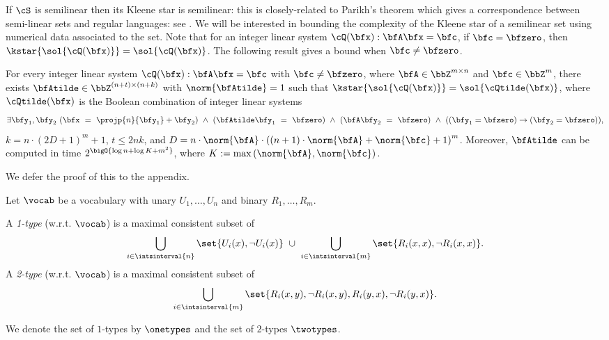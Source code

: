 If $\cS$ is semilinear then its Kleene star is semilinear: this is closely-related to Parikh's theorem which gives a correspondence between semi-linear sets and regular languages: see \cite{parikh,kleenestar}.
We will be interested in bounding the complexity of the Kleene star of a semilinear set using numerical data associated to the set.
Note that for an integer linear system $\cQ(\bfx): \bfA \bfx = \bfc$,
if $\bfc = \bfzero$, then $\kstar{\sol{\cQ(\bfx)}} = \sol{\cQ(\bfx)}$.
The following result gives a bound when $\bfc \neq \bfzero$.

\begin{lemma}\label{lem:key}
    For every integer linear system $\cQ(\bfx): \bfA \bfx = \bfc$ with $\bfc \neq \bfzero$,
    where $\bfA \in \bbZ^{m \times n}$ and $\bfc \in \bbZ^{m}$,
    there exists $\bfAtilde \in \bbZ^{(n+t) \times (n+k)}$ with $\norm{\bfAtilde} = 1$
    such that
    $\kstar{\sol{\cQ(\bfx)}} = \sol{\cQtilde(\bfx)}$,
    where $\cQtilde(\bfx)$ is the  Boolean combination of integer linear systems
    \begin{equation*}    
        \exists \bfy_1, \bfy_2\ 
        (\bfx\ =\ \projp{n}{\bfy_1} + \bfy_2)\ \land\ 
        (\bfAtilde\bfy_1\ =\ \bfzero)\ \land\ 
        (\bfA\bfy_2\ =\ \bfzero)\ \land\ 
        ((\bfy_1=\bfzero) \to (\bfy_2=\bfzero)),
    \end{equation*}
    $k = n\cdot(2D+1)^{m} + 1$,
    $t \le 2nk$, and
    $D = n \cdot \norm{\bfA} \cdot \left((n+1)\cdot \norm{\bfA} + \norm{\bfc} + 1\right)^{m}$.
    Moreover, $\bfAtilde$ can be computed in time $2^\bigO{\log n + \log K + m^2}$,
    where $K := \max\left(\norm{\bfA}, \norm{\bfc}\right)$.
\end{lemma}

We defer the proof of this to the appendix.


Let $\vocab$ be a vocabulary with unary  $U_1, \ldots, U_n$ and binary  $R_1, \ldots, R_m$.
\begin{definition}
    A \emph{1-type} (w.r.t. $\vocab$) is a maximal consistent subset of
    \begin{equation*}
        \bigcup_{i \in \intsinterval{n}}\set{U_i(x), \neg U_i(x)}
        \ \cup\ 
        \bigcup_{i \in \intsinterval{m}}\set{R_i(x, x), \neg R_i(x, x)}.
    \end{equation*}
    A \emph{2-type} (w.r.t. $\vocab$) is a maximal consistent subset of
    \begin{equation*}
        \bigcup_{i \in \intsinterval{m}}
        \set{R_i(x, y), \neg R_i(x, y), R_i(y, x), \neg R_i(y, x)}.
    \end{equation*}
\end{definition}
We denote the set of $1$-types  by $\onetypes$ and the set of $2$-types $\twotypes$.

